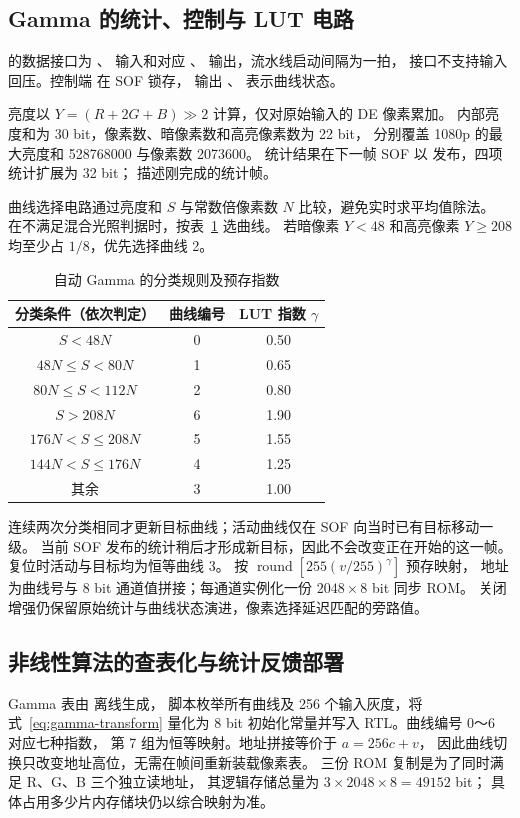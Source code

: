 \subsection{Gamma 的统计、控制与 LUT 电路}
 的数据接口为
、 输入和对应
、 输出，流水线启动间隔为一拍，
接口不支持输入回压。控制端  在 SOF 锁存，
输出 、 表示曲线状态。

亮度以 $Y=(R+2G+B)\gg2$ 计算，仅对原始输入的 DE 像素累加。
内部亮度和为 30 bit，像素数、暗像素数和高亮像素数为 22 bit，
分别覆盖 1080p 的最大亮度和 528768000 与像素数 2073600。
统计结果在下一帧 SOF 以  发布，四项统计扩展为 32 bit；
 描述刚完成的统计帧。

曲线选择电路通过亮度和 $S$ 与常数倍像素数 $N$ 比较，避免实时求平均值除法。
在不满足混合光照判据时，按表~\ref{tab:fpga-gamma-select} 选曲线。
若暗像素 $Y<48$ 和高亮像素 $Y\ge208$ 均至少占 $1/8$，优先选择曲线 2。
\begin{table}[htbp]\centering\small
\caption{自动 Gamma 的分类规则及预存指数}\label{tab:fpga-gamma-select}
\begin{tabular}{ccc}
\toprule 分类条件（依次判定） & 曲线编号 & LUT 指数 $\gamma$ \\\midrule
$S<48N$ & 0 & 0.50\\
$48N\le S<80N$ & 1 & 0.65\\
$80N\le S<112N$ & 2 & 0.80\\
$S>208N$ & 6 & 1.90\\
$176N<S\le208N$ & 5 & 1.55\\
$144N<S\le176N$ & 4 & 1.25\\
其余 & 3 & 1.00\\
\bottomrule
\end{tabular}
\end{table}
连续两次分类相同才更新目标曲线；活动曲线仅在 SOF 向当时已有目标移动一级。
当前 SOF 发布的统计稍后才形成新目标，因此不会改变正在开始的这一帧。
复位时活动与目标均为恒等曲线 3。
 按
$\operatorname{round}[255(v/255)^\gamma]$ 预存映射，
地址为曲线号与 8 bit 通道值拼接；每通道实例化一份 $2048\times8$ bit 同步 ROM。
关闭增强仍保留原始统计与曲线状态演进，像素选择延迟匹配的旁路值。

\subsection{非线性算法的查表化与统计反馈部署}
Gamma 表由  离线生成，
脚本枚举所有曲线及 256 个输入灰度，将式~\eqref{eq:gamma-transform}
量化为 8 bit 初始化常量并写入 RTL。曲线编号 0～6 对应七种指数，
第 7 组为恒等映射。地址拼接等价于 $a=256c+v$，
因此曲线切换只改变地址高位，无需在帧间重新装载像素表。
三份 ROM 复制是为了同时满足 R、G、B 三个独立读地址，
其逻辑存储总量为 $3\times2048\times8=49152$ bit；
具体占用多少片内存储块仍以综合映射为准。

